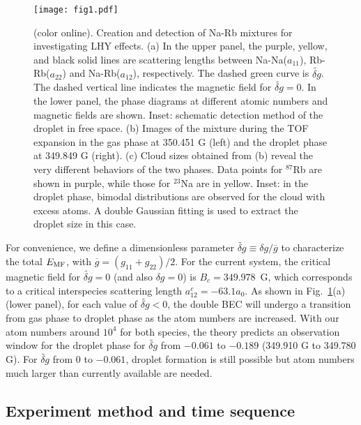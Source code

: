 \begin{figure}[t]
\begin{center}
\texttt{[image: fig1.pdf]}
\end{center}
\caption{(color online). Creation and detection of Na-Rb mixtures for investigating LHY effects. (a) In the upper panel, the purple, yellow, and black solid lines are scattering lengths between Na-Na($a_{11}$), Rb-Rb($a_{22}$) and Na-Rb($a_{12}$), respectively. The dashed green curve is $\widetilde{\delta g}$. The dashed vertical line indicates the magnetic field for $\widetilde{\delta g} = 0$. In the lower panel, the phase diagrams at different atomic numbers and magnetic fields are shown. Inset: schematic detection method of the droplet in free space. (b) Images of the mixture during the TOF expansion in the gas phase at 350.451 G (left) and the droplet phase at 349.849 G (right). (c) Cloud sizes obtained from (b) reveal the very different behaviors of the two phases. Data points for $^{87}$Rb are shown in purple, while those for $^{23}$Na are in yellow. Inset: in the droplet phase, 
bimodal distributions are observed for the cloud with excess atoms. A double Gaussian fitting is used to extract the droplet size in this case.
}
\label{fig1}
\end{figure}

For convenience, we define a dimensionless parameter $\widetilde{\delta g} \equiv \delta g/\overline{g}$ to characterize the total $E_{\rm MF}$, with $\overline{g} = (g_{11}+g_{22})/2$. For the current system, the critical magnetic field for $\widetilde{\delta g} = 0$ (and also $\delta g= 0$) is $B_c = 349.978$~G, which corresponds to a critical interspecies scattering length $a^c_{12} = -63.1 a_0$. As shown in Fig.~\ref{fig1}(a) (lower panel), for each value of $\widetilde{\delta g} < 0$, the double BEC will undergo a transition from gas phase to droplet phase as the atom numbers are increased. With our atom numbers around $10^4$ for both species, the theory predicts an observation window for the droplet phase for $\widetilde{\delta g}$ from $-0.061$ to $-0.189$ (349.910 G to 349.780 G). For $\widetilde{\delta g}$ from 0 to $-0.061$, droplet formation is still possible but atom numbers much larger than currently available are needed.

\subsection{Experiment method and time sequence}


